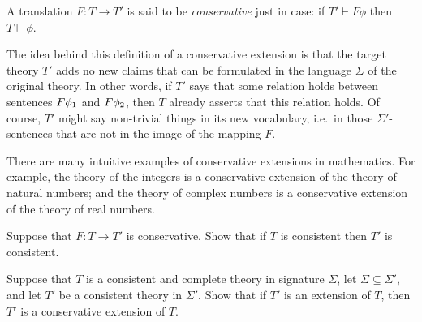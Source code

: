 \begin{defn} A translation $F:T\to T'$ is said to be
  \emph{conservative} just in case: if $T'\vdash F\phi$ then
  $T\vdash\phi$.  \label{df:conserv} \end{defn}

The idea behind this definition of a conservative extension is that
the target theory $T'$ adds no new claims that can be formulated in
the language $\Sigma$ of the original theory.  In other words, if $T'$
says that some relation holds between sentences $F\phi _1$ and
$F\phi _2$, then $T$ already asserts that this relation holds.  Of
course, $T'$ might say non-trivial things in its new vocabulary, i.e.\
in those $\Sigma '$-sentences that are not in the image of the mapping
$F$.



\begin{example} There are many intuitive examples of conservative
  extensions in mathematics.  For example, the theory of the integers
  is a conservative extension of the theory of natural numbers; and
  the theory of complex numbers is a conservative extension of the
  theory of real numbers. \end{example}

\begin{exercise} Suppose that $F:T\to T'$ is conservative.  Show that
  if $T$ is consistent then $T'$ is consistent.  \end{exercise}



\begin{exercise} Suppose that $T$ is a consistent and complete theory
  in signature $\Sigma$, let $\Sigma\subseteq \Sigma '$, and let $T'$
  be a consistent theory in $\Sigma '$.  Show that if $T'$ is an
  extension of $T$, then $T'$ is a conservative extension of
  $T$. \end{exercise}

